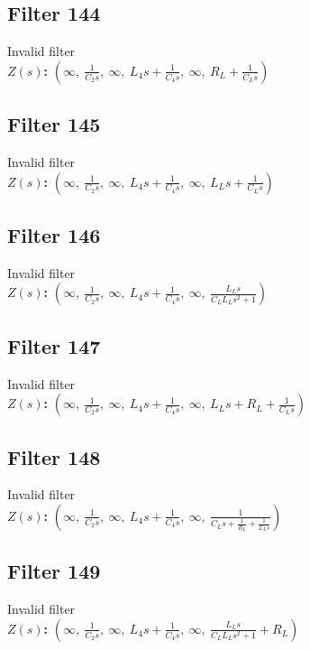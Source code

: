 \documentclass{article}
\begin{document}
\subsection*{Filter 144}
Invalid filter \\ 
\textbf{$Z(s)$:} $\left( \infty, \  \frac{1}{C_{2} s}, \  \infty, \  L_{4} s + \frac{1}{C_{4} s}, \  \infty, \  R_{L} + \frac{1}{C_{L} s}\right)$ \\ 
\subsection*{Filter 145}
Invalid filter \\ 
\textbf{$Z(s)$:} $\left( \infty, \  \frac{1}{C_{2} s}, \  \infty, \  L_{4} s + \frac{1}{C_{4} s}, \  \infty, \  L_{L} s + \frac{1}{C_{L} s}\right)$ \\ 
\subsection*{Filter 146}
Invalid filter \\ 
\textbf{$Z(s)$:} $\left( \infty, \  \frac{1}{C_{2} s}, \  \infty, \  L_{4} s + \frac{1}{C_{4} s}, \  \infty, \  \frac{L_{L} s}{C_{L} L_{L} s^{2} + 1}\right)$ \\ 
\subsection*{Filter 147}
Invalid filter \\ 
\textbf{$Z(s)$:} $\left( \infty, \  \frac{1}{C_{2} s}, \  \infty, \  L_{4} s + \frac{1}{C_{4} s}, \  \infty, \  L_{L} s + R_{L} + \frac{1}{C_{L} s}\right)$ \\ 
\subsection*{Filter 148}
Invalid filter \\ 
\textbf{$Z(s)$:} $\left( \infty, \  \frac{1}{C_{2} s}, \  \infty, \  L_{4} s + \frac{1}{C_{4} s}, \  \infty, \  \frac{1}{C_{L} s + \frac{1}{R_{L}} + \frac{1}{L_{L} s}}\right)$ \\ 
\subsection*{Filter 149}
Invalid filter \\ 
\textbf{$Z(s)$:} $\left( \infty, \  \frac{1}{C_{2} s}, \  \infty, \  L_{4} s + \frac{1}{C_{4} s}, \  \infty, \  \frac{L_{L} s}{C_{L} L_{L} s^{2} + 1} + R_{L}\right)$ \\ 
\end{document}
